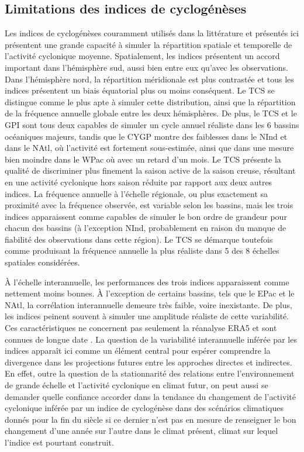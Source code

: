\documentclass[../main.tex]{subfiles}
\begin{document}
\subsection{Limitations des indices de cyclogénèses}

Les indices de cyclogénèses couramment utilisés dans la littérature et présentés ici présentent une grande capacité à simuler la répartition spatiale et
temporelle de l'activité cyclonique moyenne. Spatialement, les indices présentent un accord important dans l'hémisphère sud, aussi bien entre eux qu'avec les
observations. Dans l'hémisphère nord, la répartition méridionale est plus contrastée et tous les indices présentent un biais équatorial plus ou moins
conséquent. Le TCS se distingue comme le plus apte à simuler cette distribution, ainsi que la répartition de la fréquence annuelle globale entre les deux
hémisphères. De plus, le TCS et le GPI sont tous deux capables de simuler un cycle annuel réaliste dans les 6 bassins océaniques majeurs, tandis que le CYGP
montre des faiblesses dans le NInd et dans le NAtl, où l'activité est fortement sous-estimée, ainsi que dans une mesure bien moindre dans le WPac où avec un
retard d'un mois. Le TCS présente la qualité de discriminer plus finement la saison active de la saison creuse, résultant en une activité cyclonique hors saison
réduite par rapport aux deux autres indices. La fréquence annuelle à l'échelle régionale, ou plus exactement sa proximité avec la fréquence observée, est
variable selon les bassins, mais les trois indices apparaissent comme capables de simuler le bon ordre de grandeur pour chacun des bassins (à l'exception NInd,
probablement en raison du manque de fiabilité des observations dans cette région). Le TCS se démarque toutefois comme produisant la fréquence annuelle la plus
réaliste dans 5 des 8 échelles spatiales considérées.

À l'échelle interannuelle, les performances des trois indices apparaissent comme nettement moins bonnes. À l'exception de certains bassins, tels que le EPac et
le NAtl, la corrélation interannuelle demeure très faible, voire inexistante. De plus, les indices peinent souvent à simuler une amplitude réaliste de cette
variabilité. Ces caractéristiques ne concernent pas seulement la réanalyse ERA5 et sont connues de longue date
\parencite{watterson_seasonal_1995,camargo_tropical_2007,tippett_poisson_2011,menkes_comparison_2012,wang_dynamic_2020,cavicchia_tropical_2023a}. La question de
la variabilité interannuelle inférée par les indices apparaît ici comme un élément central pour espérer comprendre la divergence dans les projections futures
entre les approches directes et indirectes. En effet, outre la question de la stationnarité des relations entre l'environnement de grande échelle et l'activité
cyclonique en climat futur, on peut aussi se demander quelle confiance accorder dans la tendance du changement de l'activité cyclonique inférée par un indice de
cyclogénèse dans des scénários climatiques donnés pour la fin du siècle si ce dernier n'est pas en mesure de renseigner le bon changement d'une année sur
l'autre dans le climat présent, climat sur lequel l'indice est pourtant construit.
\end{document}
